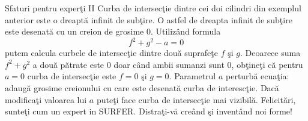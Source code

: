 \begin{surferPage}{Sfaturi pentru exper\c ti II}
Curba de intersec\c tie dintre cei doi cilindri  din exemplul anterior este o dreapt\u a infinit de sub\c tire. O astfel de dreapta infinit de sub\c tire este desenat\u a cu un creion de grosime 0. Utiliz\^and formula
\[ f^2+g^2-a=0\]
putem calcula curbele de intersec\c tie dintre dou\u a suprafe\c te 
 $f$ \c si $g$. Deoarece suma $f^2+g^2$ 
a dou\u a p\u atrate este $0$ doar c\^and ambii sumanzi sunt $0$, 
ob\c tine\c ti c\u a  pentru $a=0$ curba de intersec\c tie este  $f=0$ \c si  $g=0$.
 Parametrul $a$ perturb\u a ecua\c tia: adaug\u a grosime creionului cu care este desenat\u a curba de interesc\c tie. Dac\u a modifica\c ti  valoarea lui
 $a$ pute\c ti face curba de intersec\c tie mai vizibil\u a.
\newline \newline
Felicit\u ari, sunte\c ti cum un expert in SURFER. Distra\c ti-v\u a cre\^and \c si invent\^and noi forme!
\end{surferPage}